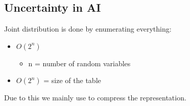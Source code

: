 \documentclass[
../../EiKI_Summary.tex,
]
{subfiles}
\begin{document}
\subsection{Uncertainty in AI}
Joint distribution is done by enumerating everything:
\begin{itemize}
    \item {} $O(2^n)$
    \begin{itemize}
        \item n = number of random variables
    \end{itemize}
    \item {} $O(2^n)$ = size of the table
\end{itemize}

Due to this we mainly use  to compress the representation.
\end{document}
